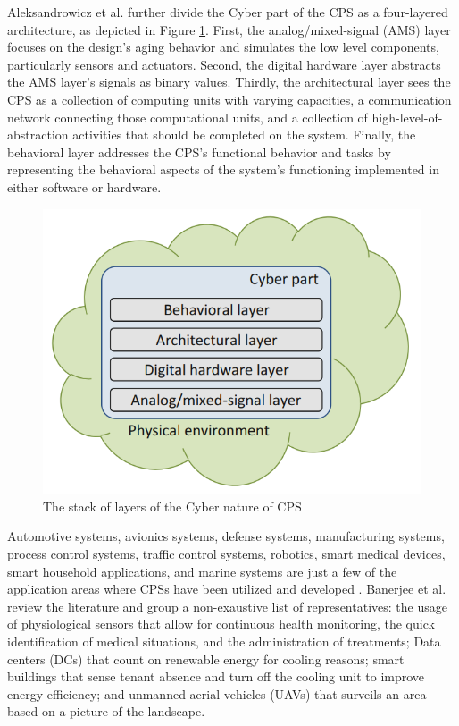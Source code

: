Aleksandrowicz et al. \cite{aleksandrowicz2018designing} further divide the Cyber part of the CPS as a four-layered architecture, as depicted in Figure \ref{fig:cyber_cps}. First, the analog/mixed-signal (AMS) layer focuses on the design's aging behavior and simulates the low level components, particularly sensors and actuators. Second, the digital hardware layer abstracts the AMS layer's signals as binary values. Thirdly, the architectural layer sees the CPS as a collection of computing units with varying capacities, a communication network connecting those computational units, and a collection of high-level-of-abstraction activities that should be completed on the system. Finally, the behavioral layer addresses the CPS's functional behavior and tasks by representing the behavioral aspects of the system's functioning implemented in either software or hardware.

\begin{figure}[!htb]
	\centering
	\includegraphics[width=0.5\linewidth]{img/cyber_CPS.png}
	\caption{The stack of layers of the Cyber nature of CPS \cite{aleksandrowicz2018designing}}
   \label{fig:cyber_cps}
\end{figure}  

Automotive systems, avionics systems, defense systems, manufacturing systems, process control systems, traffic control systems, robotics, smart medical devices, smart household applications, and marine systems are just a few of the application areas where CPSs have been utilized and developed \cite{bolbot2019vulnerabilities}. Banerjee et al. \cite{banerjee2011ensuring} review the literature and group a non-exaustive list of representatives: the usage of physiological sensors that allow for continuous health monitoring, the quick identification of medical situations, and the administration of treatments; Data centers (DCs) that count on renewable energy for cooling reasons; smart buildings that sense tenant absence and turn off the cooling unit to improve energy efficiency; and unmanned aerial vehicles (UAVs) that surveils an area based on a picture of the landscape.

